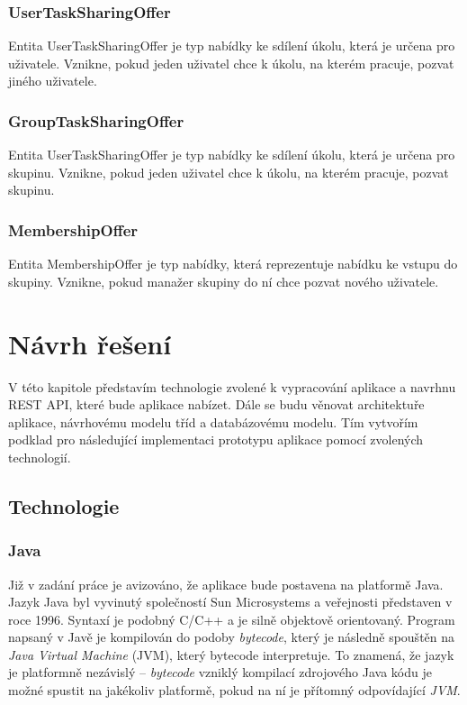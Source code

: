 \documentclass[thesis=B,czech]{FITthesis}[2012/06/26]
\begin{document}
		\subsection{UserTaskSharingOffer}
			Entita UserTaskSharingOffer je typ nabídky ke sdílení úkolu, která je určena pro uživatele. Vznikne, pokud jeden uživatel chce k úkolu, na kterém pracuje, pozvat jiného uživatele.
		
		\subsection{GroupTaskSharingOffer}
			Entita UserTaskSharingOffer je typ nabídky ke sdílení úkolu, která je určena pro skupinu. Vznikne, pokud jeden uživatel chce k úkolu, na kterém pracuje, pozvat skupinu.
		
		\subsection{MembershipOffer}
			Entita MembershipOffer je typ nabídky, která reprezentuje nabídku ke vstupu do skupiny. Vznikne, pokud manažer skupiny do ní chce pozvat nového uživatele.
		
	

\chapter{Návrh řešení}
	\label{chapter:design}
	
	V této kapitole představím technologie zvolené k vypracování aplikace a navrhnu REST API, které bude aplikace nabízet. Dále se budu věnovat architektuře aplikace, návrhovému modelu tříd a databázovému modelu. Tím vytvořím podklad pro následující implementaci prototypu aplikace pomocí zvolených technologií.

	\section{Technologie}
	
		\subsection{Java}
			Již v zadání práce je avizováno, že aplikace bude postavena na platformě Java. \cite{java} Jazyk Java byl vyvinutý společností Sun Microsystems a veřejnosti představen v roce 1996. Syntaxí je podobný C/C++ a je silně objektově orientovaný. Program napsaný v Javě je kompilován do podoby \textit{bytecode}, který je následně spouštěn na \textit{Java Virtual Machine} (JVM), který bytecode interpretuje. To znamená, že jazyk je platformně nezávislý -- \textit{bytecode} vzniklý kompilací zdrojového Java kódu je možné spustit na jakékoliv platformě, pokud na ní je přítomný odpovídající \textit{JVM}. 
			
\end{document}
